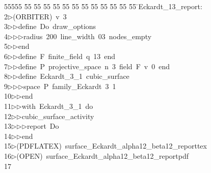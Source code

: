 %
%
\begin{tabbing}
55555 \= 55 \= 55 \= 55 \= 55 \= 55 \= 55 \= 55 \= 55 \= 55 \= 55 \= 55 \= 55 \= \>Eckardt\_13\_report:\\[0pt]
2\>$\triangleright$\>(ORBITER)\ v\ 3\ \\[0pt]
3\>$\triangleright$\>$\triangleright$\>define\ Do\ draw\_options\ \\[0pt]
4\>$\triangleright$\>$\triangleright$\>$\triangleright$\>radius\ 200\ line\_width\ 03\ nodes\_empty\ \\[0pt]
5\>$\triangleright$\>$\triangleright$\>end\ \\[0pt]
6\>$\triangleright$\>$\triangleright$\>define\ F\ finite\_field\ q\ 13\ end\ \\[0pt]
7\>$\triangleright$\>$\triangleright$\>define\ P\ projective\_space\ n\ 3\ field\ F\ v\ 0\ end\ \\[0pt]
8\>$\triangleright$\>$\triangleright$\>define\ Eckardt\_3\_1\ cubic\_surface\ \\[0pt]
9\>$\triangleright$\>$\triangleright$\>$\triangleright$\>space\ P\ family\_Eckardt\ 3\ 1\ \\[0pt]
10\>$\triangleright$\>$\triangleright$\>end\ \\[0pt]
11\>$\triangleright$\>$\triangleright$\>with\ Eckardt\_3\_1\ do\ \\[0pt]
12\>$\triangleright$\>$\triangleright$\>cubic\_surface\_activity\ \\[0pt]
13\>$\triangleright$\>$\triangleright$\>$\triangleright$\>report\ Do\ \\[0pt]
14\>$\triangleright$\>$\triangleright$\>end\\[0pt]
15\>$\triangleright$\>(PDFLATEX)\ surface\_Eckardt\_alpha12\_beta12\_reporttex\\[0pt]
16\>$\triangleright$\>(OPEN)\ surface\_Eckardt\_alpha12\_beta12\_reportpdf\\[0pt]
17\>\end{tabbing}
